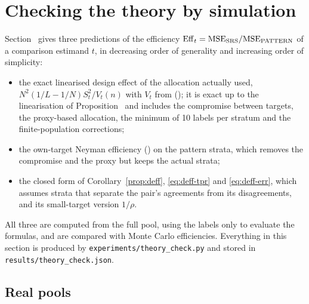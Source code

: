 \section{Checking the theory by simulation}\label{sec:simulation}

Section~ gives three predictions of the efficiency $\mathrm{Eff}_t=\mathrm{MSE}_{\rm SRS}/\mathrm{MSE}_{\rm PATTERN}$
of a comparison estimand $t$, in decreasing order of generality and increasing order of
simplicity:
\begin{itemize}
\item[LIN] the exact linearised design effect of the allocation actually used,
$N^2(1/L-1/N)S^2_t/V_t(n)$ with $V_t$ from (); it is exact up to the linearisation
of Proposition~ and includes the compromise between targets, the proxy-based
allocation, the minimum of 10 labels per stratum and the finite-population corrections;
\item[OWN] the own-target Neyman efficiency () on the pattern strata, which
removes the compromise and the proxy but keeps the actual strata;
\item[FORM] the closed form of Corollary~\ref{prop:deff}, \eqref{eq:deff-tpr} and
\eqref{eq:deff-err}, which assumes strata that separate the pair's agreements from its
disagreements, and its small-target version $1/\rho$.
\end{itemize}
All three are computed from the full pool, using the labels only to evaluate the formulas, and are
compared with Monte Carlo efficiencies. Everything in this section is produced by
\texttt{experiments/theory\_check.py} and stored in \texttt{results/theory\_check.json}.

\subsection{Real pools}\label{sec:sim-real}

